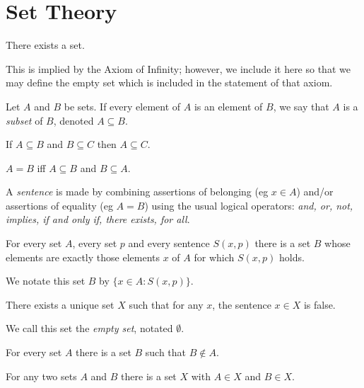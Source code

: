 \chapter{Set Theory}
\begin{axiom}[Existence]
  There exists a set.
\end{axiom}
\begin{rem}
  This is implied by the Axiom of Infinity; however, we include it here so that
  we may define the empty set which is included in the statement of that axiom.
\end{rem}
\begin{defn}
  Let $A$ and $B$ be sets.
  If every element of $A$ is an element of $B$, we say that $A$ is a
  \emph{subset} of $B$, denoted $A\subseteq B$.
\end{defn}
\begin{prop}
  If $A\subseteq B$ and $B\subseteq C$ then $A\subseteq C$.
\end{prop}
\begin{axiom}[Extensionality]
  $A=B$ iff $A\subseteq B$ and $B\subseteq A$.
\end{axiom}
\begin{defn}
  A \emph{sentence} is made by combining assertions of belonging (eg $x\in A$)
  and/or assertions of equality (eg $A=B$) using the usual logical operators:
  \emph{and, or, not, implies, if and only if, there exists, for all}.
\end{defn}
\begin{axiom}[Specification]
  For every set $A$, every set $p$ and every sentence $S(x,p)$ there is a set
  $B$ whose elements are exactly those elements $x$ of $A$ for which $S(x,p)$ 
  holds.
\end{axiom}
\begin{defn}
  We notate this set $B$ by $\{x\in A: S(x,p)\}$.
\end{defn}
\begin{prop}
  There exists a unique set $X$ such that for any $x$, the sentence
  $x\in X$ is false.
\end{prop}
\begin{defn}
  We call this set the \emph{empty set}, notated $\emptyset$.
\end{defn}
\begin{prop}
  For every set $A$ there is a set $B$ such that $B\not\in A$.
\end{prop}
\begin{axiom}[Pairing]
  For any two sets $A$ and $B$ there is a set $X$ with $A\in X$ and $B\in X$.
\end{axiom}
